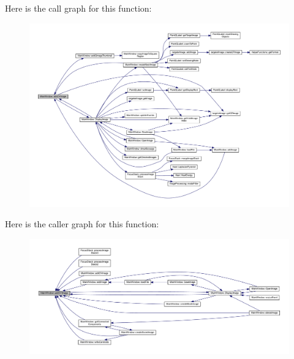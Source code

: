 Here is the call graph for this function\+:
\nopagebreak
\begin{figure}[H]
\begin{center}
\leavevmode
\includegraphics[width=350pt]{class_main_window_a0c29749703b7fc8a64a17d123816bfac_cgraph}
\end{center}
\end{figure}
Here is the caller graph for this function\+:
\nopagebreak
\begin{figure}[H]
\begin{center}
\leavevmode
\includegraphics[width=350pt]{class_main_window_a0c29749703b7fc8a64a17d123816bfac_icgraph}
\end{center}
\end{figure}
\mbox{\label{class_main_window_ab87edc0e4b2fb3e4fb4df14a8872cbb4}} 
